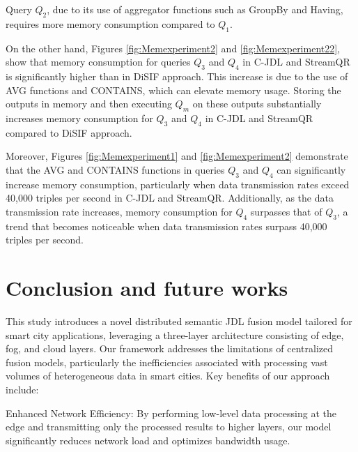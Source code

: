 \documentclass[5p,times]{elsarticle}
\begin{document}
Query $Q_2$, due to its use of aggregator functions such as GroupBy and Having,
 requires more memory consumption compared to $Q_1$.

On the other hand, Figures \ref{fig:Memexperiment2} and \ref{fig:Memexperiment22}, show that memory consumption
 for queries $Q_3$ and $Q_4$ in C-JDL and StreamQR is significantly higher than 
 in DiSIF approach. This increase is due to the use of AVG functions 
 and CONTAINS, which can elevate memory usage. Storing the outputs in
  memory and then executing $Q_m$ on these outputs substantially increases memory
   consumption for $Q_3$ and $Q_4$ in C-JDL and StreamQR compared
    to DiSIF approach.


Moreover, Figures \ref{fig:Memexperiment1} and \ref{fig:Memexperiment2} demonstrate
 that the AVG and CONTAINS functions in queries $Q_3$ and $Q_4$ can significantly
  increase memory consumption, particularly when data transmission rates exceed 40,000
   triples per second in C-JDL and StreamQR. Additionally, as the data transmission rate
    increases, memory consumption for $Q_4$ surpasses that of $Q_3$, a trend that becomes
     noticeable when data transmission rates surpass 40,000 triples per second.

%

\section{Conclusion and future works}
This study introduces a novel distributed semantic JDL fusion model tailored for smart city applications, leveraging a three-layer architecture consisting of edge, fog, and cloud layers. Our framework addresses the limitations of centralized fusion models, particularly the inefficiencies associated with processing vast volumes of heterogeneous data in smart cities. Key benefits of our approach include: 

Enhanced Network Efficiency: By performing low-level data processing at the edge and transmitting only the processed results to higher layers, our model significantly reduces network load and optimizes bandwidth usage.
\end{document}
